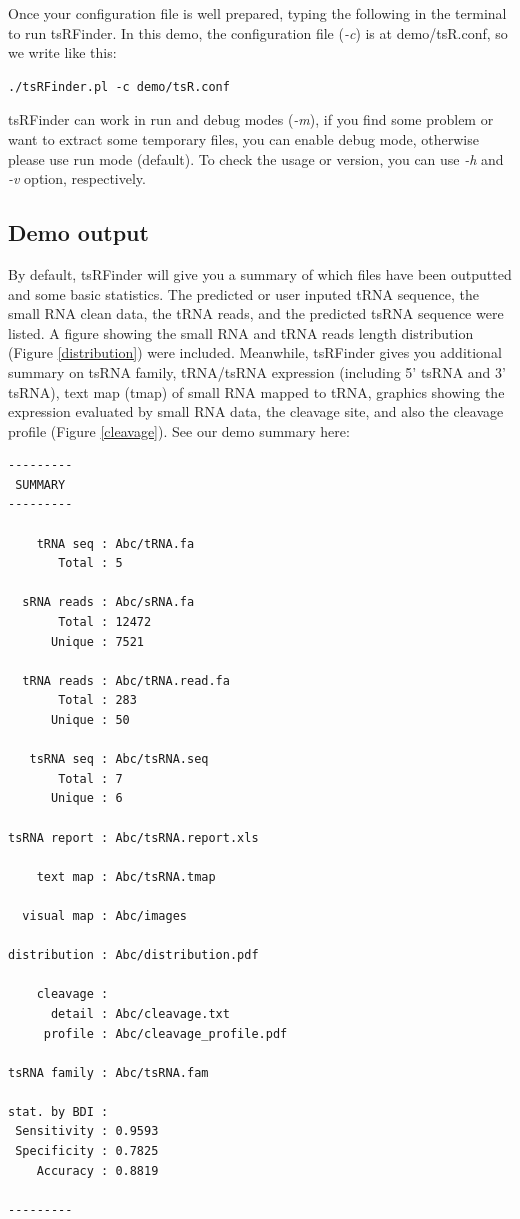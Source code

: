 \documentclass[11pt, a4paper]{article}
\begin{document}
Once your configuration file is well prepared, typing the following in the terminal to run tsRFinder. In this demo, the configuration file (\emph{-c}) is at demo/tsR.conf, so we write like this:

{\footnotesize \begin{tcolorbox}[colback=blue!5!white,colframe=blue!75!black,title=Running tsRFinder demo]
\begin{verbatim}
./tsRFinder.pl -c demo/tsR.conf
\end{verbatim}
\end{tcolorbox}}

tsRFinder can work in run and debug modes (\emph{-m}), if you find some problem or want to extract some temporary files, you can enable debug mode, otherwise please use run mode (default). To check the usage or version, you can use \emph{-h} and \emph{-v} option, respectively.

\subsection{Demo output}

By default, tsRFinder will give you a summary of which files have been outputted and some basic statistics. The predicted or user inputed tRNA sequence, the small RNA clean data, the tRNA reads, and the predicted tsRNA sequence were listed. A figure showing the small RNA and tRNA reads length distribution (Figure \ref{distribution}) were included. Meanwhile, tsRFinder gives you additional summary on tsRNA family, tRNA/tsRNA expression (including 5' tsRNA and 3' tsRNA), text map (tmap) of small RNA mapped to tRNA, graphics showing the expression evaluated by small RNA data, the cleavage site, and also the cleavage profile (Figure \ref{cleavage}).
See our demo summary here:

{\footnotesize \begin{tcolorbox}[colback=blue!5!white,colframe=blue!75!black,title=tsRFinder demo output list]
\begin{verbatim}
---------
 SUMMARY 
---------

    tRNA seq : Abc/tRNA.fa
       Total : 5

  sRNA reads : Abc/sRNA.fa
       Total : 12472
      Unique : 7521

  tRNA reads : Abc/tRNA.read.fa
       Total : 283
      Unique : 50

   tsRNA seq : Abc/tsRNA.seq
       Total : 7
      Unique : 6

tsRNA report : Abc/tsRNA.report.xls

    text map : Abc/tsRNA.tmap

  visual map : Abc/images

distribution : Abc/distribution.pdf

    cleavage :
      detail : Abc/cleavage.txt
     profile : Abc/cleavage_profile.pdf

tsRNA family : Abc/tsRNA.fam

stat. by BDI :
 Sensitivity : 0.9593
 Specificity : 0.7825
    Accuracy : 0.8819

---------
\end{verbatim}
\end{tcolorbox}}
\end{document}
